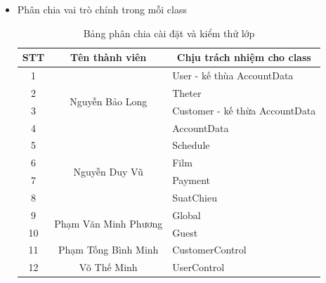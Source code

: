 \documentclass[a4paper, 12pt]{article}
\begin{document}
\begin{itemize}
	\item Phân chia vai trò chính trong mỗi class
	\begin{table}[H]
		\begin{center}
			\begin{tabular}{|c|c|l|}
			\hline
			STT & Tên thành viên                        & \multicolumn{1}{c|}{Chịu trách nhiệm cho class} \\ \hline
			1   & \multirow{4}{*}{Nguyễn Bảo Long}      & User - kế thùa AccountData                      \\ \cline{1-1} \cline{3-3} 
			2   &                                       & Theter                                          \\ \cline{1-1} \cline{3-3} 
			3   &                                       & Customer - kế thừa AccountData                  \\ \cline{1-1} \cline{3-3} 
			4   &                                       & AccountData                                     \\ \hline
			5   & \multirow{4}{*}{Nguyễn Duy Vũ}        & Schedule                                        \\ \cline{1-1} \cline{3-3} 
			6   &                                       & Film                                            \\ \cline{1-1} \cline{3-3} 
			7   &                                       & Payment                                         \\ \cline{1-1} \cline{3-3} 
			8   &                                       & SuatChieu                                       \\ \hline
			9   & \multirow{2}{*}{Phạm Văn Minh Phương} & Global                                          \\ \cline{1-1} \cline{3-3} 
			10  &                                       & Guest                                           \\ \hline
			11  & Phạm Tống Bình Minh                   & CustomerControl                                 \\ \hline
			12  & Võ Thế Minh                           & UserControl                                     \\ \hline
			\end{tabular}
			\caption{Bảng phân chia cài đặt và kiểm thử lớp}
		\end{center}
	\end{table}


\end{itemize}
\end{document}
